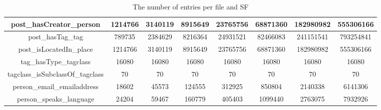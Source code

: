 \begin{table}[H]
{\begin{tabular} {| c | c | c | c | c | c | c | c |}
        \hline                                                                                                                      
        post\_hasCreator\_person        & 1214766       & 3140119       & 8915649  & 23765756 & 68871360 	& 182980982 & 555306166  \\ 
        \hline                                                                                                                      
        post\_hasTag\_tag               & 789735        & 2384629       & 8216364  & 24931521 & 82466083 	& 241151541 & 793254841  \\ 
        \hline                                                                                                                      
        post\_isLocatedIn\_place        & 1214766       & 3140119       & 8915649  & 23765756 & 68871360 	& 182980982 & 555306166  \\ 
        \hline                                                                                                                      
        tag\_hasType\_tagclass          & 16080         & 16080         & 16080    & 16080    & 16080 		& 16080 		& 16080 		 \\ 
        \hline                                                                                                                      
        tagclass\_isSubclassOf\_tagclass& 70            & 70            & 70       & 70       & 70 				& 70 				& 70 				 \\ 
        \hline                                                                                                                      
        person\_email\_emailaddress     & 18602         & 45573         & 124555   & 312925   & 850804 		& 2140338 	& 6141306 	 \\ 
        \hline                                                                                                                      
        person\_speaks\_language        & 24204         & 59467         & 160779   & 405403   & 1099440 	& 2763075 	& 7932926 	 \\ 
        \hline
        \hline
      \end{tabular}
}
\caption {The number of entries per file and SF}
\end{table}
